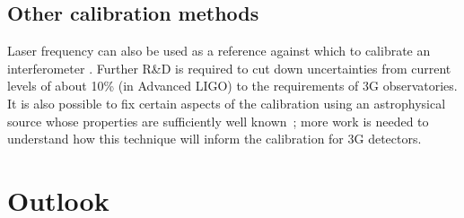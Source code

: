\subsection{Other calibration methods}
Laser frequency can also be used as a reference against which to calibrate an interferometer \cite{Leong2012, PhysRevD.95.062003}. Further R\&D is required to cut down uncertainties from current levels of about 10\% (in Advanced LIGO) to the requirements of 3G observatories.
It is also possible to fix certain aspects of the calibration using an astrophysical source whose properties are sufficiently well known~\cite{CalibrationGW170817,Pitkin:2015kgm}; more work is needed to understand how this technique will inform the calibration for 3G detectors.


\section{Outlook}

